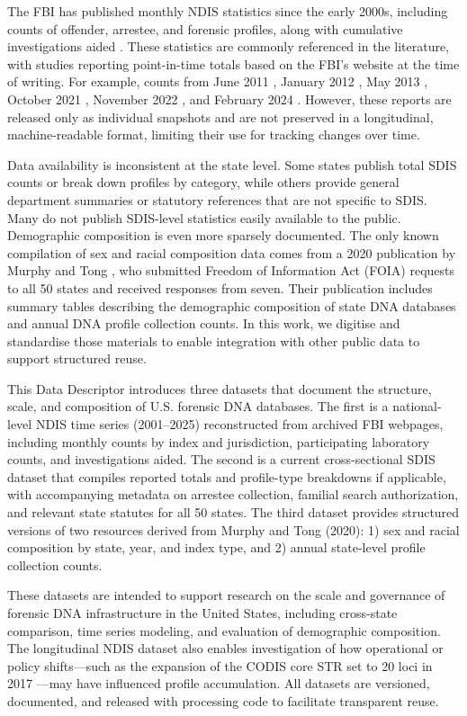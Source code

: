 \documentclass{article}
\begin{document}
The FBI has published monthly NDIS statistics since the early 2000s, including counts of offender, arrestee, and forensic profiles, along with cumulative investigations aided \cite{Unknown2022-qe}. These statistics are commonly referenced in the literature, with studies reporting point-in-time totals based on the FBI's website at the time of writing. For example, counts from June 2011 \cite{Ge2012-if}, January 2012 \cite{Ge2012-ve}, May 2013 \cite{Ge2014-rl}, October 2021 \cite{Wickenheiser2022-tb}, November 2022 \cite{Link2023-dm}, and February 2024 \cite{Greenwald2024-sg}. However, these reports are released only as individual snapshots and are not preserved in a longitudinal, machine-readable format, limiting their use for tracking changes over time.

Data availability is inconsistent at the state level. Some states publish total SDIS counts or break down profiles by category, while others provide general department summaries or statutory references that are not specific to SDIS. Many do not publish SDIS-level statistics easily available to the public. Demographic composition is even more sparsely documented. The only known compilation of sex and racial composition data comes from a 2020 publication by Murphy and Tong \cite{Murphy2020-pc}, who submitted Freedom of Information Act (FOIA) requests to all 50 states and received responses from seven. Their publication includes summary tables describing the demographic composition of state DNA databases and annual DNA profile collection counts. In this work, we digitise and standardise those materials to enable integration with other public data to support structured reuse.

This Data Descriptor introduces three datasets that document the structure, scale, and composition of U.S. forensic DNA databases. The first is a national-level NDIS time series (2001--2025) reconstructed from archived FBI webpages, including monthly counts by index and jurisdiction, participating laboratory counts, and investigations aided. The second is a current cross-sectional SDIS dataset that compiles reported totals and profile-type breakdowns if applicable, with accompanying metadata on arrestee collection, familial search authorization, and relevant state statutes for all 50 states. The third dataset provides structured versions of two resources derived from Murphy and Tong (2020): 1) sex and racial composition by state, year, and index type, and 2) annual state-level profile collection counts.

These datasets are intended to support research on the scale and governance of forensic DNA infrastructure in the United States, including cross-state comparison, time series modeling, and evaluation of demographic composition. The longitudinal NDIS dataset also enables investigation of how operational or policy shifts---such as the expansion of the CODIS core STR set to 20 loci in 2017 \cite{Hares2015-ep}---may have influenced profile accumulation. All datasets are versioned, documented, and released with processing code to facilitate transparent reuse.
\end{document}
